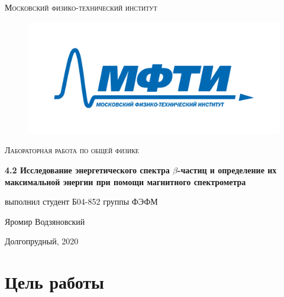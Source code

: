 \documentclass[a4paper]{article}
\begin{document}
\newcommand{\apple}{\char"F8FF}

\begin{titlepage}
	\centering
	\vspace{5cm}
    {\scshape\LARGE Московский физико-технический институт\par}
    
\begin{figure}[H]
\begin{center}
\includegraphics[scale = 0.4]{mipt_rus_text.png}
\label{default}
\end{center}
\end{figure}

	\vspace{3cm}
	{\scshape\Large Лабораторная работа по общей физике \par}
	\vspace{1cm}
    {\huge\bfseries  4.2 Исследование энергетического спектра $\beta$-частиц и определение их 
    максимальной энергии при помощи магнитного спектрометра \par}
	\vspace{1cm}
	\vfill
\begin{flushright}
	{\large выполнил студент Б04-852 группы ФЭФМ}\par
	\vspace{0.3cm}
	{\LARGE Яромир Водзяновский}
\end{flushright}
	
	\vfill
Долгопрудный, 2020
\end{titlepage}

\pagestyle{fancy} 
\fancyhead[C]{}
\fancyfoot[C]{ \noindent\rule{\textwidth}{0.4pt} \thepage }

\tableofcontents

\newpage


\section{Цель работы}
\end{document}
